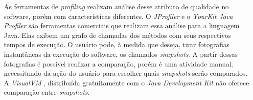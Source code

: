 As ferramentas de \textit{profiling} realizam análise desse atributo de qualidade no software, porém com características diferentes. O \textit{JProfiler} \cite{JProfiler} e o \textit{YourKit Java Profiler} \cite{Profiler2016} são ferramentas comerciais que realizam essa análise para a linguagem Java. Elas exibem um grafo de chamadas dos métodos com seus respectivos tempos de execução. O usuário pode, à medida que deseja, tirar fotografias instantâneas da execução do software, os chamados \textit{snapshots}. A partir dessas fotografias é possível realizar a comparação, porém é uma atividade manual, necessitando da ação do usuário para escolher quais \textit{snapshots} serão comparados. A \textit{VisualVM} \cite{Vis}, distribuída gratuitamente com o \textit{Java Development Kit}  não oferece comparação entre \textit{snapshots}.



